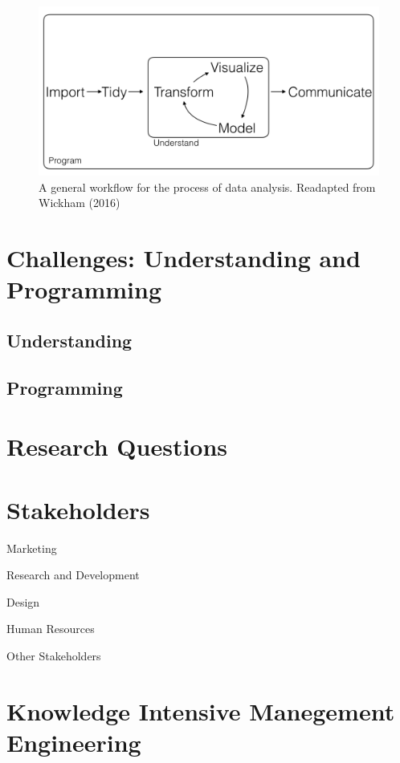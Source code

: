 \documentclass[]{book}
\begin{document}
\begin{figure}

{\centering \includegraphics[width=0.8\linewidth]{_bookdown_files/figures/main_work_flow} 

}

\caption{A general workflow for the process of data analysis. Readapted from Wickham (2016)}\label{fig:mainworkflow}
\end{figure}

\section{Challenges: Understanding and
Programming}\label{challenges-understanding-and-programming}

\subsection{Understanding}\label{understanding}

\subsection{Programming}\label{programming}

\section{Research Questions}\label{research-questions}

\section{Stakeholders}\label{stakeholders}

Marketing

Research and Development

Design

Human Resources

Other Stakeholders

\section{Knowledge Intensive Manegement
Engineering}\label{knowledge-intensive-manegement-engineering}
\end{document}
